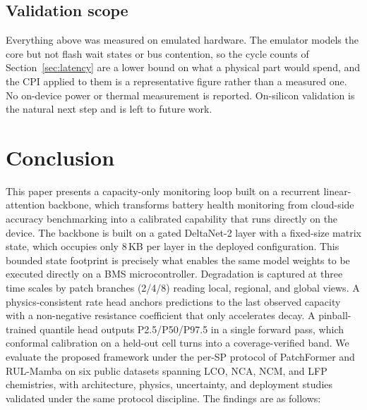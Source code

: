 \documentclass[final,5p,times,twocolumn]{elsarticle}
\begin{document}
\subsection{Validation scope}
\label{sec:deploy_limits}

Everything above was measured on emulated hardware. The emulator models the
core but not flash wait states or bus contention, so the cycle counts of
Section~\ref{sec:latency} are a lower bound on what a physical part would
spend, and the CPI applied to them is a representative figure rather than a
measured one. No on-device power or thermal measurement is reported.
On-silicon validation is the natural next step and is left to future work.

\section{Conclusion}
\label{sec:conclusion}

This paper presents a capacity-only monitoring loop built on a recurrent linear-attention backbone, 
which transforms battery health monitoring from cloud-side accuracy benchmarking into a calibrated capability
that runs directly on the device. The backbone is built on a gated DeltaNet-2 layer with a fixed-size matrix state, 
which occupies only $8$\,KB per layer in the deployed configuration.
This bounded state footprint is precisely what enables the same model weights to be executed directly on a 
BMS microcontroller. Degradation is captured at three time scales by patch branches (2/4/8) reading local, regional, 
and global views. A physics-consistent rate head anchors predictions to the last observed capacity  with a 
non-negative resistance coefficient that only accelerates decay.  A pinball-trained quantile head outputs 
P2.5/P50/P97.5 in a single forward pass, which conformal calibration on a held-out cell turns into a coverage-verified band.
We evaluate the proposed framework under the per-SP protocol of PatchFormer and RUL-Mamba on six public datasets 
spanning LCO, NCA, NCM, and LFP chemistries, with architecture, physics, uncertainty, 
and deployment studies validated under the same protocol discipline. The findings
are as follows:
\end{document}
